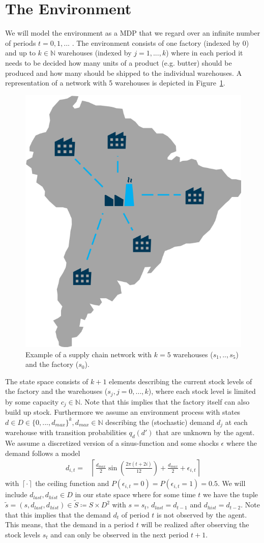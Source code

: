 \documentclass[journal, a4paper]{IEEEtran}
\theoremstyle{plain}
\theoremstyle{definition}
\begin{document}
\section{The Environment}
We will model the environment as a MDP that we regard over an infinite number of periods $t = 0, 1, ...$ . The environment consists of one factory (indexed by $0$) and up to $k \in \mathbb{N}$ warehouses (indexed by $j=1,...,k$) where in each period it needs to be decided how many units of a product (e.g. butter) should be produced and how many should be shipped to the individual warehouses. A representation of a network with 5 warehouses is depicted in Figure~\ref{model_example}. 
\begin{figure}[h]
	\centering
	\includegraphics[width=0.4\columnwidth]{model.png}
	\caption{\label{model_example}Example of a supply chain network with $k=5$ warehouses ($s_1, .., s_5$) and the factory ($s_0$).}
\end{figure}
The state space consists of $k+1$ elements describing the current stock levels of the factory and the warehouses ($s_j, j=0,...,k$), where each stock level is limited by some capacity $c_j \in \mathbb{N}$. Note that this implies that the factory itself can also build up stock. Furthermore we assume an environment process with states $d \in D \in \{0,..., d_{max}\}^k, d_{max} \in \mathbb{N}$ describing the (stochastic) demand $d_j$ at each warehouse with transition probabilities $q_d(d')$ that are unknown by the agent. We assume a discretized version of a sinus-function and some shocks $\epsilon$ where the demand follows a model 
\begin{equation}
	\begin{split}
		d_{i,t} = &\left\lceil \frac{d_{max}}{2} \sin\left( \frac{2 \pi (t + 2i) }{12}\right) + \frac{d_{max}}{2} + \epsilon_{i,t} \right\rceil
	\end{split}
\end{equation}
with $\left\lceil \cdot \right\rceil$ the ceiling function and $P(\epsilon_{i,t}=0) = P(\epsilon_{i,t}=1) = 0.5$. We will include $d_{last}, d_{hist} \in D$ in our state space where for some time $t$ we have the tuple $\tilde{s} = (s, d_{last}, d_{hist}) \in \tilde{S} \coloneqq S \times D^2$ with $s = s_t$, $d_{last} = d_{t-1}$ and $d_{hist} = d_{t-2}$. Note that this implies that the demand $d_t$ of period $t$ is not observed by the agent. This means, that the demand in a period $t$ will be realized after observing the stock levels $s_t$ and can only be observed in the next period $t+1$.
\end{document}
